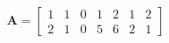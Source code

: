 \documentclass[12 pt]{slides}
\begin{document}
\begingroup
\[\textbf{A} = \begin{bmatrix}1 & 1 & 0 & 1 & 2 & 1 & 2\\
2 & 1 & 0 & 5 & 6 & 2 & 1\end{bmatrix}\]
\endgroup
\end{document}
